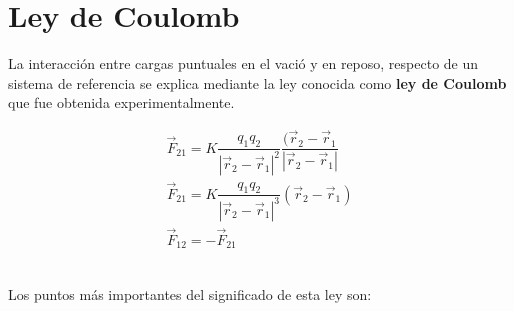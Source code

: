 \documentclass[../main]{subfiles}
\begin{document}
\section{Ley de Coulomb}
La interacción entre cargas puntuales en el vació y en reposo, respecto de un sistema de referencia se explica mediante la ley conocida como \textbf{ley de Coulomb} que fue obtenida experimentalmente.\\[0.5cm]
\begin{minipage}{0.5\textwidth}
    \begin{align}
        \Vec{F}_{21}=K\dfrac{q_1 q_2}{|\Vec{r}_2-\Vec{r}_1|^2} \dfrac{(\Vec{r}_2-\Vec{r}_1}{|\Vec{r}_2-\Vec{r}_1|} \\
        \Vec{F}_{21}=K\dfrac{q_1 q_2}{|\vec{r}_2-\vec{r}_1|^3}(\Vec{r}_2-\vec{r}_1) \\
        \boxed{\vec{F}_{12}=-\vec{F}_{21}}
    \end{align}
\end{minipage}
\begin{minipage}{0.5\textwidth}
    
\end{minipage}
\\[0.5cm]
Los puntos más importantes del significado de esta ley son:
\end{document}
